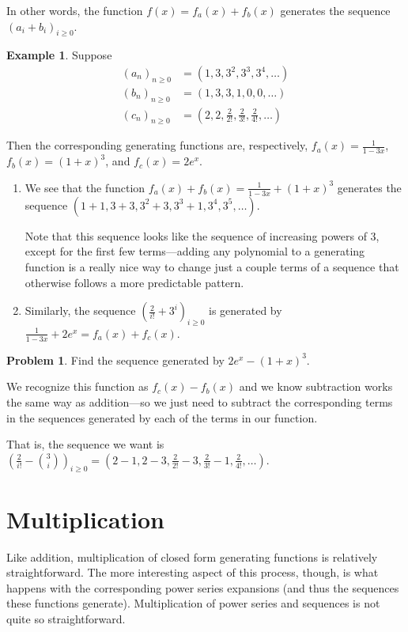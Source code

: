 \documentclass{article}
\theoremstyle{definition}
\newtheorem{example}{Example}
\newtheorem{problem}{Problem}
\begin{document}
In other words, the function $f(x)=f_{a}(x)+f_{b}(x)$ generates the sequence $\left(a_{i}+b_{i}\right)_{i \geq 0}$.

\begin{example}
Suppose
\begin{align}
\left(a_{n}\right)_{n \geq 0} &= \left(1,3,3^{2}, 3^{3}, 3^{4}, \ldots\right) \\
\left(b_{n}\right)_{n \geq 0} &= (1,3,3,1,0,0, \ldots) \\
\left(c_{n}\right)_{n \geq 0} &= \left(2,2, \frac{2}{2!}, \frac{2}{3!}, \frac{2}{4!}, \ldots\right)
\end{align}

Then the corresponding generating functions are, respectively, $f_{a}(x)=\frac{1}{1-3 x}$, $f_{b}(x)=(1+x)^{3}$, and $f_{c}(x)=2 e^{x}$.

\begin{enumerate}[label=(\alph*)]
\item We see that the function $f_{a}(x)+f_{b}(x)=\frac{1}{1-3 x}+(1+x)^{3}$ generates the sequence $\left(1+1,3+3,3^{2}+3,3^{3}+1,3^{4}, 3^{5}, \ldots\right)$.

Note that this sequence looks like the sequence of increasing powers of 3, except for the first few terms---adding any polynomial to a generating function is a really nice way to change just a couple terms of a sequence that otherwise follows a more predictable pattern.

\item Similarly, the sequence $\left(\frac{2}{i!}+3^{i}\right)_{i \geq 0}$ is generated by $\frac{1}{1-3 x}+2 e^{x}=f_{a}(x)+f_{c}(x)$.
\end{enumerate}
\end{example}

\begin{problem}
Find the sequence generated by $2 e^{x}-(1+x)^{3}$.
\end{problem}

We recognize this function as $f_{c}(x)-f_{b}(x)$ and we know subtraction works the same way as addition---so we just need to subtract the corresponding terms in the sequences generated by each of the terms in our function.

That is, the sequence we want is $\left(\frac{2}{i!}-\binom{3}{i}\right)_{i \geq 0}=\left(2-1,2-3, \frac{2}{2!}-3, \frac{2}{3!}-1, \frac{2}{4!}, \ldots\right)$.

\section*{Multiplication}
Like addition, multiplication of closed form generating functions is relatively straightforward. The more interesting aspect of this process, though, is what happens with the corresponding power series expansions (and thus the sequences these functions generate). Multiplication of power series and sequences is not quite so straightforward.
\end{document}
